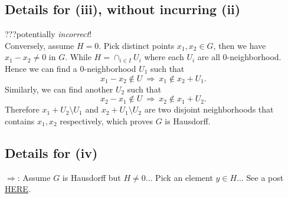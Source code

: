 \subsection{Details for (iii), without incurring (ii)}
???potentially \textit{incorrect}!\\ Conversely, assume $H=0$. Pick distinct points $x_1,x_2\in G$, then we have $x_1-x_2\neq 0$ in $G$. 
While $H=\cap_{i\in I} U_i$ where each $U_i$ are all $0$-neighborhood. Hence we can find a $0$-neighborhood $U_1$ such that $$x_1-x_2\notin U ~\Rightarrow~ x_1\notin x_2+U_1.$$ 
Similarly, we can find another $U_2$ such that $$x_2-x_1\notin U ~\Rightarrow~ x_2\notin x_1+U_2.$$
Therefore $x_1+U_2\setminus U_1$ and $x_2+U_1\setminus U_2$ are two disjoint neighborhoods that contains $x_1,x_2$ respectively, which proves $G$ is Hausdorff.

\subsection{Details for (iv)}
$\Rightarrow$: Assume $G$ is Hausdorff but $H\neq 0$... Pick an element $y\in H$... See a post \href{URLhttps://math.stackexchange.com/questions/421109/questions-about-the-intersection-of-all-neighborhoods-of-0-in-a-topological-ab}{HERE}. 
